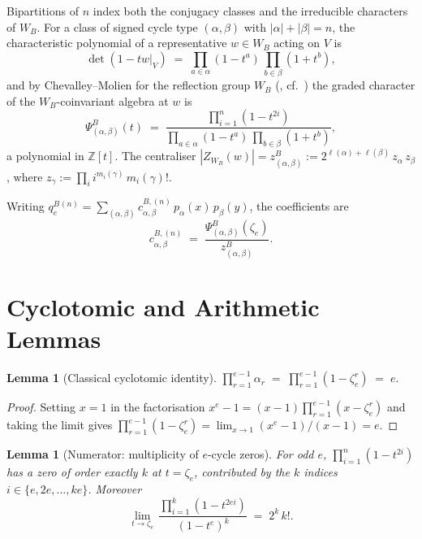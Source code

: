 \documentclass[11pt]{article}
\newtheorem{lemma}[theorem]{Lemma}
\theoremstyle{remark}
\newcommand{\qeB}{q_e^{B}}
\newcommand{\zetae}{\zeta_e}
\newcommand{\ZZ}{\mathbb{Z}}
\newcommand{\WB}{W_B}
\newcommand{\PsiB}{\Psi^{B}}
\newcommand{\zB}{z^{B}}
\begin{document}
Bipartitions of $n$ index both the conjugacy classes and the irreducible characters of $\WB$. For a class of signed cycle type $(\alpha, \beta)$ with $|\alpha| + |\beta| = n$, the characteristic polynomial of a representative $w \in \WB$ acting on $V$ is
\[
  \det(1 - t w|_V) \;=\; \prod_{a \in \alpha}(1 - t^a)\,\prod_{b \in \beta}(1 + t^b),
\]
and by Chevalley--Molien for the reflection group $\WB$ (\cite[\S 3.20]{Hum90}, cf.\ \cite{Cli26-typeB-discovery}) the graded character of the $\WB$-coinvariant algebra at $w$ is
\begin{equation}\label{eq:cheva-molien-B}
  \PsiB_{(\alpha,\beta)}(t) \;=\; \frac{\prod_{i=1}^n(1 - t^{2i})}{\prod_{a \in \alpha}(1 - t^a)\,\prod_{b \in \beta}(1 + t^b)},
\end{equation}
a polynomial in $\ZZ[t]$. The centraliser $|Z_{\WB}(w)| = \zB_{(\alpha,\beta)} := 2^{\ell(\alpha)+\ell(\beta)}\, z_\alpha\, z_\beta$, where $z_\gamma := \prod_i i^{m_i(\gamma)}\, m_i(\gamma)!$.

Writing $\qeB^{(n)} = \sum_{(\alpha, \beta)} c^{B,(n)}_{\alpha,\beta}\, p_\alpha(x)\, p_\beta(y)$, the coefficients are
\begin{equation}\label{eq:c-def}
  c^{B,(n)}_{\alpha, \beta} \;=\; \frac{\PsiB_{(\alpha,\beta)}(\zetae)}{\zB_{(\alpha,\beta)}}.
\end{equation}

\section{Cyclotomic and Arithmetic Lemmas}

\begin{lemma}[Classical cyclotomic identity]\label{lem:cyclo}
$\displaystyle \prod_{r=1}^{e-1}\alpha_r \;=\; \prod_{r=1}^{e-1}(1 - \zetae^r) \;=\; e.$
\end{lemma}

\begin{proof}
Setting $x = 1$ in the factorisation $x^{e} - 1 = (x - 1)\prod_{r=1}^{e-1}(x - \zetae^r)$ and taking the limit gives $\prod_{r=1}^{e-1}(1 - \zetae^r) = \lim_{x \to 1}(x^e - 1)/(x - 1) = e$.
\end{proof}

\begin{lemma}[Numerator: multiplicity of $e$-cycle zeros]\label{lem:numerator-e-cycles}
For odd $e$, $\prod_{i=1}^n(1 - t^{2i})$ has a zero of order exactly $k$ at $t = \zetae$, contributed by the $k$ indices $i \in \{e, 2e, \ldots, ke\}$. Moreover
\[
  \lim_{t \to \zetae}\, \frac{\prod_{i=1}^k (1 - t^{2ei})}{(1 - t^e)^{k}} \;=\; 2^{k}\, k!.
\]
\end{lemma}
\end{document}
